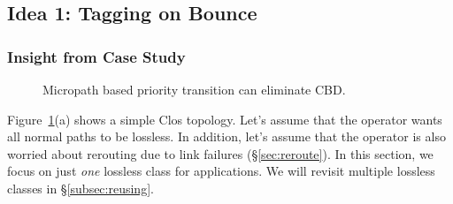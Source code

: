  


\subsection{Idea 1: Tagging on Bounce}\label{subsec:tag}

\subsubsection{Insight from Case Study}

\begin{figure}[t]
	\centering
	
	
	
	\caption{Micropath based priority transition can eliminate CBD.}\label{fig:priority_transition}
\end{figure}

Figure~\ref{fig:priority_transition}(a) shows a simple Clos topology. Let's
assume that the operator wants all normal paths to be lossless. In addition,
let's assume that the operator is also worried about rerouting due to link 
failures (\S\ref{sec:reroute}). In this section, we focus on just {\em one}
lossless class for applications. We will revisit multiple lossless classes in \S\ref{subsec:reusing}.

